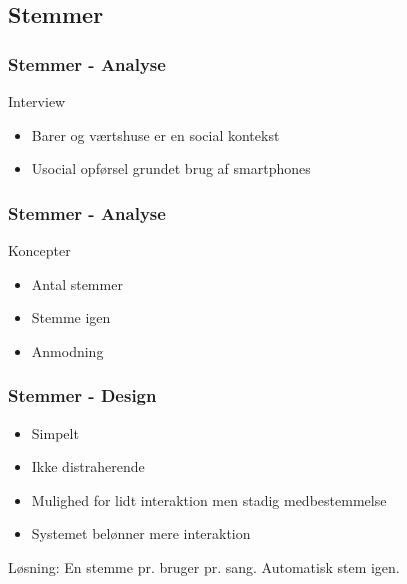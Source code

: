 \subsection{Stemmer}
\begin{frame}
	\frametitle{Stemmer - Analyse}
	Interview
	\begin{itemize}
		\item Barer og værtshuse er en social kontekst
		\item Usocial opførsel grundet brug af smartphones
	\end{itemize}
\end{frame}

\begin{frame}
	\frametitle{Stemmer - Analyse}
	Koncepter
	\begin{itemize}
		\item Antal stemmer
		\item Stemme igen
		\item Anmodning
	\end{itemize}
\end{frame}

\begin{frame}
	\frametitle{Stemmer - Design}
	\begin{itemize}
		\item Simpelt
		\item Ikke distraherende
		\item Mulighed for lidt interaktion men stadig medbestemmelse
		\item Systemet belønner mere interaktion
	\end{itemize}
	Løsning: En stemme pr. bruger pr. sang. Automatisk stem igen.
\end{frame}